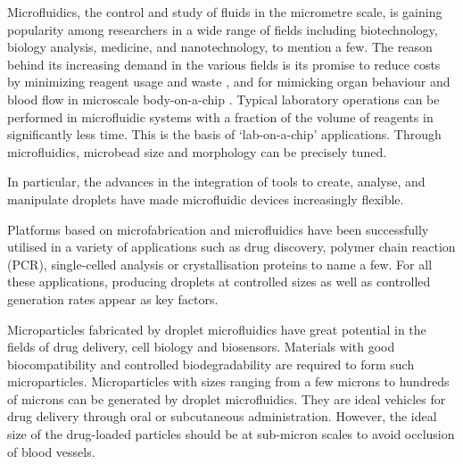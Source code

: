 Microfluidics, the control and study of fluids in the micrometre scale, is gaining popularity among researchers in a wide range of fields including biotechnology, biology analysis, medicine, and nanotechnology, to mention a few. \parencite{Chen2013,Rabiee2021,Scheler2019} The reason behind its increasing demand in the various fields is its promise to reduce costs by minimizing reagent usage and waste \parencite{Pinto2014}, and for mimicking organ behaviour and blood flow in microscale body-on-a-chip \parencite{Selimovi2013}. Typical laboratory operations can be performed in microfluidic systems with a fraction of the volume of reagents in significantly less time. This is the basis of ‘lab-on-a-chip’ applications. Through microfluidics, microbead size and morphology can be precisely tuned.
\blankline

In particular, the advances in the integration of tools to create, analyse, and manipulate droplets have made microfluidic devices increasingly flexible.\parencite{Nge2013}

Platforms based on microfabrication and microfluidics have been successfully utilised in a variety of applications such as drug discovery, polymer chain reaction (PCR), single-celled analysis or crystallisation proteins to name a few. For all these applications, producing droplets at controlled sizes as well as controlled generation rates appear as key factors.\parencite{Krsti2018,Li2018}

Microparticles fabricated by droplet microfluidics have great potential in the fields of drug delivery, cell biology and biosensors. Materials with good biocompatibility and controlled biodegradability are required to form such microparticles. Microparticles with sizes ranging from a few microns to hundreds of microns can be generated by droplet microfluidics. They are ideal vehicles for drug delivery through oral or subcutaneous administration. However, the ideal size of the drug-loaded particles should be at sub-micron scales to avoid occlusion of blood vessels.

